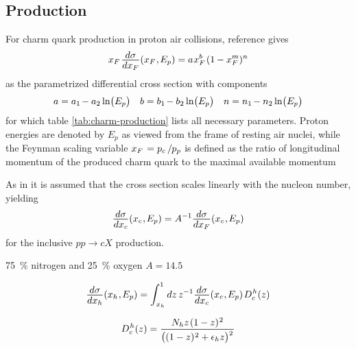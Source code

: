 \subsection*{Production}

For charm quark production in proton air collisions, reference \cite{Goncalves_2007} gives
\begin{equation*}
	x_F \kern+1.0pt \frac{\raisebox{-0.5ex}{$d\sigma$}}{\raisebox{0.5ex}{$dx_F$}} (x_F \kern+0.5pt, \kern-0.5pt E_p)
	= a \kern+0.5pt x_F^b \kern+1.0pt (1 \kern-0.3pt - x_F^m)^n
\end{equation*}
as the parametrized differential cross section with components
\begin{align*}
	a = a_1 \kern-1.0pt - a_2 \ln\bigl(E_p\bigr) && b = b_1 \kern-1.0pt - b_2 \ln\bigl(E_p\bigr) &&
	n = n_1 \kern-1.0pt - n_2 \ln\bigl(E_p\bigr)
\end{align*}
for which table \ref{tab:charm-production} lists all necessary parameters. Proton energies are denoted by $E_p$ as viewed from
the frame of resting air nuclei, while the Feynman scaling variable $x_F \kern+1.0pt = p_c \kern+1.5pt / \kern-0.5pt p_p$
is defined as the ratio of longitudinal momentum of the produced charm quark to the maximal available momentum 



As in \cite{Bhattacharya_2015} it is assumed that the cross section scales linearly with the nucleon number, yielding
\begin{equation*}
	\frac{\raisebox{-0.5ex}{$d\sigma$}}{\raisebox{0.5ex}{$dx_c$}} (x_c \kern+0.5pt, \kern-0.5pt E_p) = A^{-1}
	\frac{\raisebox{-0.5ex}{$d\sigma$}}{\raisebox{0.5ex}{$dx_F$}} (x_c \kern+0.5pt, \kern-0.5pt E_p)
\end{equation*}
for the inclusive $pp \rightarrow cX$ production.

\qty{75}{\percent} nitrogen and \qty{25}{\percent} oxygen $A = \num{14.5}$

\begin{equation*}
	\frac{\raisebox{-0.5ex}{$d\sigma$}}{\raisebox{0.5ex}{$dx_h$}} (x_h \kern+0.5pt, \kern-0.5pt E_p) = \int_{\kern+0.5pt x_h}^1 dz \, z^{-1}
	\frac{\raisebox{-0.5ex}{$d\sigma$}}{\raisebox{0.5ex}{$dx_c$}} (x_c \kern+0.5pt, \kern-0.5pt E_p) \kern+1.0pt D^{\kern+0.5pt h}_c (z)
\end{equation*}



\begin{equation}
	D^{\kern+0.5pt h}_{c}(z) = \frac{N_h z \kern+1.0pt (1 - z)^{\kern+0.5pt 2}}
	{\bigl((1 - z)^{\kern+0.5pt 2} + \epsilon_h z \bigl)^{\raisebox{-1.5ex}{$^2$}}}
	\label{eqn:fragmentation}
\end{equation}



